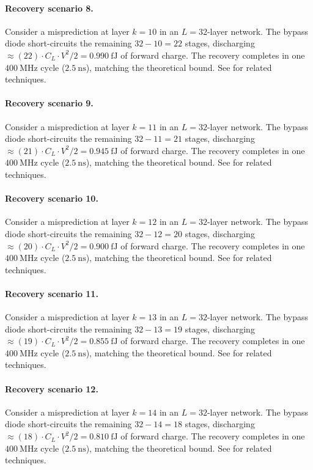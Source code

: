 \paragraph{Recovery scenario 8.}
Consider a misprediction at layer $k = 10$ in an $L = 32$-layer network.
The bypass diode short-circuits the remaining $32 - 10 = 22$ stages,
discharging $\approx (22) \cdot C_L \cdot V^2 / 2 = 0.990~\text{fJ}$
of forward charge. The recovery completes in one $400~\text{MHz}$ cycle ($2.5~\text{ns}$),
matching the theoretical bound. See \cite{dabre2022survey} for related techniques.

\paragraph{Recovery scenario 9.}
Consider a misprediction at layer $k = 11$ in an $L = 32$-layer network.
The bypass diode short-circuits the remaining $32 - 11 = 21$ stages,
discharging $\approx (21) \cdot C_L \cdot V^2 / 2 = 0.945~\text{fJ}$
of forward charge. The recovery completes in one $400~\text{MHz}$ cycle ($2.5~\text{ns}$),
matching the theoretical bound. See \cite{dabre2022survey} for related techniques.

\paragraph{Recovery scenario 10.}
Consider a misprediction at layer $k = 12$ in an $L = 32$-layer network.
The bypass diode short-circuits the remaining $32 - 12 = 20$ stages,
discharging $\approx (20) \cdot C_L \cdot V^2 / 2 = 0.900~\text{fJ}$
of forward charge. The recovery completes in one $400~\text{MHz}$ cycle ($2.5~\text{ns}$),
matching the theoretical bound. See \cite{dabre2022survey} for related techniques.

\paragraph{Recovery scenario 11.}
Consider a misprediction at layer $k = 13$ in an $L = 32$-layer network.
The bypass diode short-circuits the remaining $32 - 13 = 19$ stages,
discharging $\approx (19) \cdot C_L \cdot V^2 / 2 = 0.855~\text{fJ}$
of forward charge. The recovery completes in one $400~\text{MHz}$ cycle ($2.5~\text{ns}$),
matching the theoretical bound. See \cite{dabre2022survey} for related techniques.

\paragraph{Recovery scenario 12.}
Consider a misprediction at layer $k = 14$ in an $L = 32$-layer network.
The bypass diode short-circuits the remaining $32 - 14 = 18$ stages,
discharging $\approx (18) \cdot C_L \cdot V^2 / 2 = 0.810~\text{fJ}$
of forward charge. The recovery completes in one $400~\text{MHz}$ cycle ($2.5~\text{ns}$),
matching the theoretical bound. See \cite{dabre2022survey} for related techniques.

